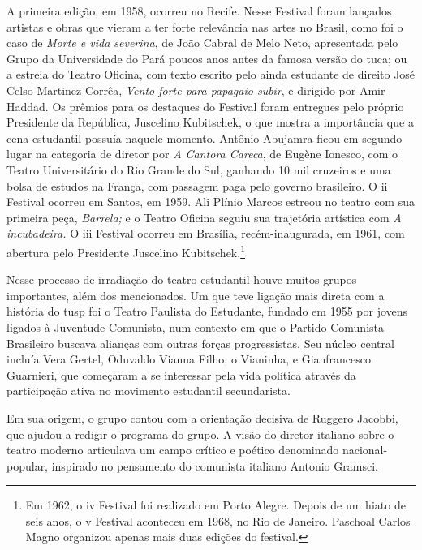 A primeira edição, em 1958, ocorreu no Recife. Nesse Festival foram
lançados artistas e obras que vieram a ter forte relevância nas artes no
Brasil, como foi o caso de {\it Morte e vida severina}, de João Cabral
de Melo Neto, apresentada pelo Grupo da Universidade do Pará poucos anos
antes da famosa versão do {\sc tuca}; ou a estreia do Teatro Oficina, com
texto escrito pelo ainda estudante de direito José Celso Martinez
Corrêa, {\it Vento forte para papagaio subir}, e dirigido por Amir
Haddad. Os prêmios para os destaques do Festival foram entregues pelo
próprio Presidente da República, Juscelino Kubitschek, o que mostra a
importância que a cena estudantil possuía naquele momento. Antônio
Abujamra ficou em segundo lugar na categoria de diretor por {\it A
Cantora Careca}, de Eugène Ionesco, com o Teatro Universitário do Rio
Grande do Sul, ganhando 10 mil cruzeiros e uma bolsa de estudos na
França, com passagem paga pelo governo brasileiro. O {\sc ii} Festival ocorreu
em Santos, em 1959. Ali Plínio Marcos estreou no teatro com sua primeira
peça, {\it Barrela;} e o Teatro Oficina seguiu sua trajetória artística
com {\it A incubadeira.} O {\sc iii} Festival ocorreu em Brasília,
recém-inaugurada, em 1961, com abertura pelo Presidente Juscelino
Kubitschek.\footnote{Em 1962, o {\sc iv} Festival foi realizado em Porto
  Alegre. Depois de um hiato de seis anos, o {\sc v} Festival aconteceu em
  1968, no Rio de Janeiro. Paschoal Carlos Magno organizou apenas mais
  duas edições do festival.}

\subject{Estudantes e a ideia de nacional-popular: Teatro Paulista do
Estudante}

Nesse processo de irradiação do teatro estudantil houve muitos grupos
importantes, além dos mencionados. Um que teve ligação mais direta com a
história do {\sc tusp} foi o Teatro Paulista do Estudante, fundado em 1955 por
jovens ligados à Juventude Comunista, num contexto em que o Partido
Comunista Brasileiro buscava alianças com outras forças progressistas.
Seu núcleo central incluía Vera Gertel, Oduvaldo Vianna Filho, o
Vianinha, e Gianfrancesco Guarnieri, que começaram a se interessar pela
vida política através da participação ativa no movimento estudantil
secundarista.

Em sua origem, o grupo contou com a orientação decisiva de Ruggero
Jacobbi, que ajudou a redigir o programa do grupo. A visão do diretor
italiano sobre o teatro moderno articulava um campo crítico e poético
denominado nacional-popular, inspirado no pensamento do comunista
italiano Antonio Gramsci.

